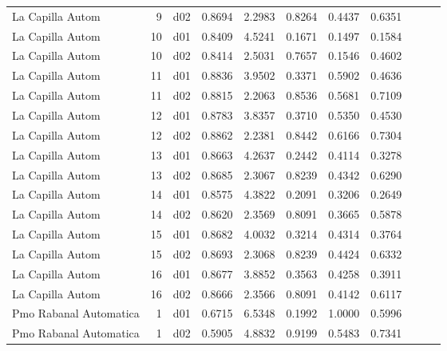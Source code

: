\begin{landscape}
\begin{longtable}{p{2cm}rrrrrrrrrr}
        La Capilla Autom  &          9 &     d02 &   0.8694 &  2.2983 &        0.8264 &           0.4437 &  0.6351 \\
        La Capilla Autom  &         10 &     d01 &   0.8409 &  4.5241 &        0.1671 &           0.1497 &  0.1584 \\
        La Capilla Autom  &         10 &     d02 &   0.8414 &  2.5031 &        0.7657 &           0.1546 &  0.4602 \\
        La Capilla Autom  &         11 &     d01 &   0.8836 &  3.9502 &        0.3371 &           0.5902 &  0.4636 \\
        La Capilla Autom  &         11 &     d02 &   0.8815 &  2.2063 &        0.8536 &           0.5681 &  0.7109 \\
        La Capilla Autom  &         12 &     d01 &   0.8783 &  3.8357 &        0.3710 &           0.5350 &  0.4530 \\
        La Capilla Autom  &         12 &     d02 &   0.8862 &  2.2381 &        0.8442 &           0.6166 &  0.7304 \\
        La Capilla Autom  &         13 &     d01 &   0.8663 &  4.2637 &        0.2442 &           0.4114 &  0.3278 \\
        La Capilla Autom  &         13 &     d02 &   0.8685 &  2.3067 &        0.8239 &           0.4342 &  0.6290 \\
        La Capilla Autom  &         14 &     d01 &   0.8575 &  4.3822 &        0.2091 &           0.3206 &  0.2649 \\
        La Capilla Autom  &         14 &     d02 &   0.8620 &  2.3569 &        0.8091 &           0.3665 &  0.5878 \\
        La Capilla Autom  &         15 &     d01 &   0.8682 &  4.0032 &        0.3214 &           0.4314 &  0.3764 \\
        La Capilla Autom  &         15 &     d02 &   0.8693 &  2.3068 &        0.8239 &           0.4424 &  0.6332 \\
        La Capilla Autom  &         16 &     d01 &   0.8677 &  3.8852 &        0.3563 &           0.4258 &  0.3911 \\
        La Capilla Autom  &         16 &     d02 &   0.8666 &  2.3566 &        0.8091 &           0.4142 &  0.6117 \\
 Pmo Rabanal Automatica   &          1 &     d01 &   0.6715 &  6.5348 &        0.1992 &           1.0000 &  0.5996 \\
 Pmo Rabanal Automatica   &          1 &     d02 &   0.5905 &  4.8832 &        0.9199 &           0.5483 &  0.7341 \\

\end{longtable}
\end{landscape}
